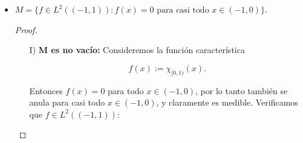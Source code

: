 \begin{itemize}
\begin{proof}
\begin{enumerate}
\begin{align*}
\int_{-1}^{1} g(x)\, dx &= \int_{-1}^{1} \left( f(x) - \frac{1}{2} \int_{-1}^{1} f(t)\, dt \right)\, dx \\
&= \int_{-1}^{1} f(x)\, dx - \frac{1}{2} \int_{-1}^{1} f(t)\, dt \cdot \int_{-1}^{1} dx \\
&= \int_{-1}^{1} f(x)\, dx - \frac{1}{2} \int_{-1}^{1} f(t)\, dt \cdot 2 \\
&= \int_{-1}^{1} f(x)\, dx - \int_{-1}^{1} f(x)\, dx = 0.
\end{align*}

Así, \( g \in M \).

\vspace{0.5em}
Ahora, tomemos \( h \in M \) y calculemos \( (f - g, h) \):

\begin{align*}
(f - g, h) &= \int_{-1}^{1} \left[ f(x) - \left( f(x) - \frac{1}{2} \int_{-1}^{1} f(t)\, dt \right) \right] h(x)\, dx \\
&= \int_{-1}^{1} \left( \frac{1}{2} \int_{-1}^{1} f(t)\, dt \right) h(x)\, dx \\
&= \left( \frac{1}{2} \int_{-1}^{1} f(t)\, dt \right) \left( \int_{-1}^{1} h(x)\, dx \right).
\end{align*}

Como \( h \in M \), se tiene que \( \int_{-1}^{1} h(x)\, dx = 0 \), y por lo tanto:
\[
(f - g, h) = 0.
\]

Así, \( g = f(x) - \frac{1}{2} \int_{-1}^{1} f(t)\, dt \) es la proyección ortogonal de \( f \) sobre \( M \), es decir,

\[
(P_M f)(x) = f(x) - \frac{1}{2} \int_{-1}^{1} f(t)\,dt.
\]

        \end{enumerate}
    \end{proof}
    \item \( M = \{ f \in L^2((-1,1)) : f(x) = 0 \text{ para casi todo } x \in (-1,0) \} \).
    \begin{proof}
        \hfill
        \begin{enumerate}
            \item[I)] \textbf{M es no vacío:} Consideremos la función característica

\[
f(x) := \chi_{[0,1)}(x).
\]

Entonces \( f(x) = 0 \) para todo \( x \in (-1,0) \), por lo tanto también se anula para casi todo \( x \in (-1,0) \), y claramente es medible. Verificamos que \( f \in L^2((-1,1)) \):


\end{enumerate}
\end{proof}
\end{itemize}
